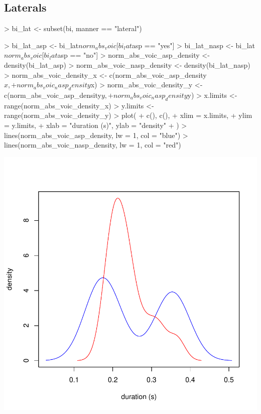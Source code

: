 \documentclass[a4paper,11pt]{article}
\begin{document}
\subsection{Laterals}

\begin{Schunk}
\begin{Sinput}
> bi_lat <- subset(bi, manner == "lateral")
\end{Sinput}
\end{Schunk}

\begin{Schunk}
\begin{Sinput}
> bi_lat_asp <- bi_lat$norm_abs_voic[bi_lat$asp == "yes"]
> bi_lat_nasp <- bi_lat$norm_abs_voic[bi_lat$asp == "no"]
> norm_abs_voic_asp_density <- density(bi_lat_asp)
> norm_abs_voic_nasp_density <- density(bi_lat_nasp)
> norm_abs_voic_density_x <- c(norm_abs_voic_asp_density$x, 
+                                   norm_abs_voic_nasp_density$x)
> norm_abs_voic_density_y <- c(norm_abs_voic_asp_density$y, 
+                                   norm_abs_voic_nasp_density$y)
> x.limits <- range(norm_abs_voic_density_x)
> y.limits <- range(norm_abs_voic_density_y)
> plot(
+ c(), c(),
+ xlim = x.limits,
+ ylim = y.limits,
+ xlab = "duration (s)", ylab = "density"
+ )
> lines(norm_abs_voic_asp_density, lw = 1, col = "blue")
> lines(norm_abs_voic_nasp_density, lw = 1, col = "red")
\end{Sinput}
\end{Schunk}
\includegraphics{analysis-028}
\end{document}
